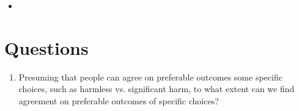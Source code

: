 \documentclass [11pt]{article}
\begin{document}
\begin{itemize}
\item  
\end{itemize}

\section{Questions}
\begin{enumerate}
	\item  Presuming that people can agree on preferable outcomes some specific choices, such as harmless vs. significant harm, to what extent can we find agreement on preferable outcomes of specific choices?

 

 

\end{enumerate}
\nocite{*}


\end{document}
